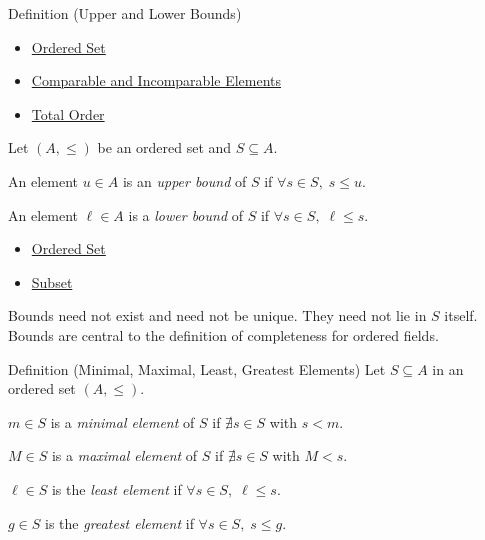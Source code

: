 \begin{definitionbox}{Definition (Upper and Lower Bounds)}

\begin{dependencies}
\begin{itemize}
  \item \hyperref[def:ordered-set]{Ordered Set}
  \item \hyperref[def:comparable]{Comparable and Incomparable Elements}
  \item \hyperref[def:total-order]{Total Order}
\end{itemize}
\end{dependencies}
\begin{definition}\label{def:bounds}
Let $(A,\leq)$ be an ordered set and $S \subseteq A$.

An element $u \in A$ is an \emph{upper bound} of $S$ if $\forall s \in S,\; s \leq u$.

An element $\ell \in A$ is a \emph{lower bound} of $S$ if $\forall s \in S,\; \ell \leq s$.
\end{definition}
\end{definitionbox}

\begin{dependencies}
\begin{itemize}
  \item \hyperref[def:ordered-set]{Ordered Set}
  \item \hyperref[def:subset]{Subset}
\end{itemize}
\end{dependencies}

\begin{remark*}[Consequence]
Bounds need not exist and need not be unique. They need not lie in $S$ itself.
Bounds are central to the definition of completeness for ordered fields.
\end{remark*}

\begin{propositionbox}{Definition (Minimal, Maximal, Least, Greatest Elements)}
\label{def:min-max}
Let $S \subseteq A$ in an ordered set $(A,\leq)$.

$m \in S$ is a \emph{minimal element} of $S$ if $\nexists s \in S$ with $s < m$.

$M \in S$ is a \emph{maximal element} of $S$ if $\nexists s \in S$ with $M < s$.

\smallskip
\label{def:least-greatest}
$\ell \in S$ is the \emph{least element} if $\forall s \in S,\; \ell \leq s$.

$g \in S$ is the \emph{greatest element} if $\forall s \in S,\; s \leq g$.
\end{propositionbox}

